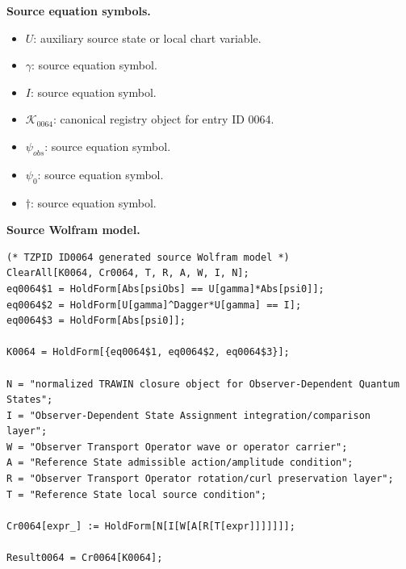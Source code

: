 \begin{minipage}[t]{0.49\linewidth}
\begingroup
\small
\raggedright
\textbf{Source equation symbols.}\par
\begin{itemize}[leftmargin=1.35em,itemsep=1pt,topsep=1pt,parsep=0pt]
    \item $U$: auxiliary source state or local chart variable.
    \item $\gamma$: source equation symbol.
    \item $I$: source equation symbol.
    \item $\mathcal{K}_{0064}$: canonical registry object for entry ID 0064.
    \item $\psi_{obs}$: source equation symbol.
    \item $\psi_{0}$: source equation symbol.
    \item $\dagger$: source equation symbol.
\end{itemize}
\endgroup
\end{minipage}\hfill
\begin{minipage}[t]{0.47\linewidth}
\begingroup
\scriptsize
\raggedright
\textbf{Source Wolfram model.}\par
\begin{Verbatim}[fontsize=\tiny,breaklines=true,breakanywhere=true]
(* TZPID ID0064 generated source Wolfram model *)
ClearAll[K0064, Cr0064, T, R, A, W, I, N];
eq0064$1 = HoldForm[Abs[psiObs] == U[gamma]*Abs[psi0]];
eq0064$2 = HoldForm[U[gamma]^Dagger*U[gamma] == I];
eq0064$3 = HoldForm[Abs[psi0]];

K0064 = HoldForm[{eq0064$1, eq0064$2, eq0064$3}];

N = "normalized TRAWIN closure object for Observer-Dependent Quantum States";
I = "Observer-Dependent State Assignment integration/comparison layer";
W = "Observer Transport Operator wave or operator carrier";
A = "Reference State admissible action/amplitude condition";
R = "Observer Transport Operator rotation/curl preservation layer";
T = "Reference State local source condition";

Cr0064[expr_] := HoldForm[N[I[W[A[R[T[expr]]]]]]];

Result0064 = Cr0064[K0064];
\end{Verbatim}
\endgroup
\end{minipage}

